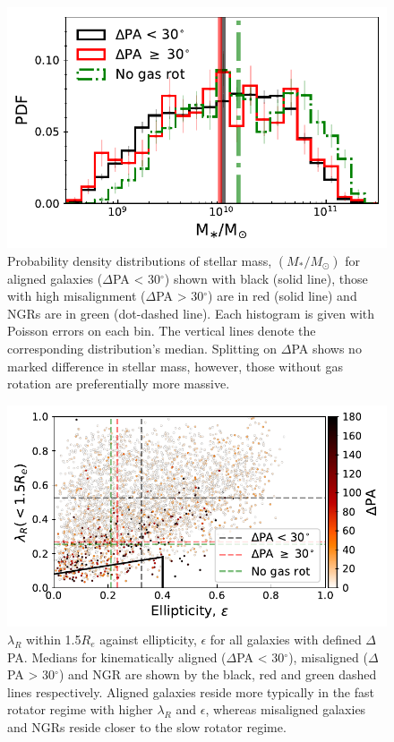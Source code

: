 \documentclass[fleqn,usenatbib]{mnras}
\begin{document}
\begin{figure}
	\includegraphics[width=\linewidth]{total_pop/delPA_stelM.pdf}
    \caption{Probability density distributions of stellar mass, $(M_{\ast}/M_{\odot})$ for aligned galaxies ($\Delta$PA < 30$^{\circ}$) shown with black (solid line), those with high misalignment ($\Delta$PA > 30$^{\circ}$) are in red (solid line) and NGRs are in green (dot-dashed line). Each histogram is given with Poisson errors on each bin. The vertical lines denote the corresponding distribution's median. Splitting on $\Delta$PA shows no marked difference in stellar mass, however, those without gas rotation are preferentially more massive.}
    \label{fig:delPA_stelM}
\end{figure}

\begin{figure}
	\includegraphics[width=\linewidth]{total_pop/delPA_lambda_Re.pdf}
    \caption{$\lambda_R$ within 1.5$R_e$ against ellipticity, $\epsilon$ for all galaxies with defined $\Delta$PA. Medians for kinematically aligned ($\Delta$PA < 30$^{\circ}$), misaligned ($\Delta$PA > 30$^{\circ}$) and NGR are shown by the black, red and green dashed lines respectively. Aligned galaxies reside more typically in the fast rotator regime with higher $\lambda_R$ and $\epsilon$, whereas misaligned galaxies and NGRs reside closer to the slow rotator regime.}
    \label{fig:delPA_lambda_Re}
\end{figure}
\end{document}
